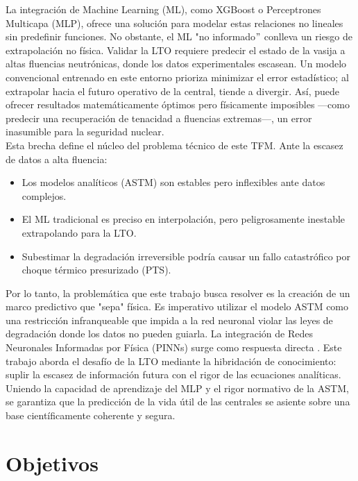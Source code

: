\documentclass[a4paper, 12pt, twocolumn]{book}
\begin{document}
La integración de Machine Learning (ML), como XGBoost o Perceptrones Multicapa (MLP), ofrece una solución para modelar estas relaciones no lineales sin predefinir funciones. No obstante, el ML "no informado$"$ conlleva un riesgo de extrapolación no física. Validar la LTO requiere predecir el estado de la vasija a altas fluencias neutrónicas, donde los datos experimentales escasean. Un modelo convencional entrenado en este entorno prioriza minimizar el error estadístico; al extrapolar hacia el futuro operativo de la central, tiende a divergir. Así, puede ofrecer resultados matemáticamente óptimos pero físicamente imposibles —como predecir una recuperación de tenacidad a fluencias extremas—, un error inasumible para la seguridad nuclear.\\

Esta brecha define el núcleo del problema técnico de este TFM. Ante la escasez de datos a alta fluencia:

\begin{itemize}
    \item Los modelos analíticos (ASTM) son estables pero inflexibles ante datos complejos.
    \item El ML tradicional es preciso en interpolación, pero peligrosamente inestable extrapolando para la LTO.
    \item Subestimar la degradación irreversible podría causar un fallo catastrófico por choque térmico presurizado (PTS).
\end{itemize}

Por lo tanto, la problemática que este trabajo busca resolver es la creación de un marco predictivo que "sepa" física. Es imperativo utilizar el modelo ASTM como una restricción infranqueable que impida a la red neuronal violar las leyes de degradación donde los datos no pueden guiarla. La integración de Redes Neuronales Informadas por Física (PINNs) surge como respuesta directa \parencite{raissi2019physics}. Este trabajo aborda el desafío de la LTO mediante la hibridación de conocimiento: suplir la escasez de información futura con el rigor de las ecuaciones analíticas. Uniendo la capacidad de aprendizaje del MLP y el rigor normativo de la ASTM, se garantiza que la predicción de la vida útil de las centrales se asiente sobre una base científicamente coherente y segura.

\section{Objetivos}
\end{document}

